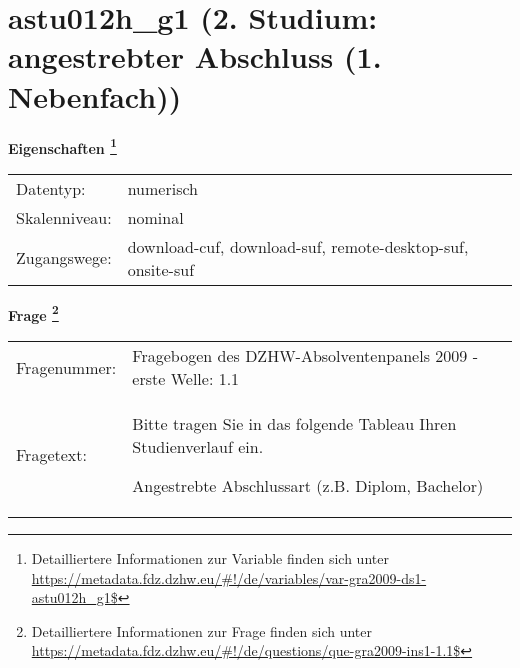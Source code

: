 
    \setcounter{footnote}{0}

    \vspace*{-1.8cm}
	\section{astu012h\_g1 (2. Studium: angestrebter Abschluss (1. Nebenfach))}
	\label{section:astu012h_g1}



    \vspace*{0.5cm}
    \noindent\textbf{Eigenschaften
	\footnote{Detailliertere Informationen zur Variable finden sich unter
		\url{https://metadata.fdz.dzhw.eu/\#!/de/variables/var-gra2009-ds1-astu012h_g1$}}}\\
	\begin{tabularx}{\hsize}{@{}lX}
	Datentyp: & numerisch \\
	Skalenniveau: & nominal \\
	Zugangswege: &
	  download-cuf, 
	  download-suf, 
	  remote-desktop-suf, 
	  onsite-suf
 \\
    \end{tabularx}



				\vspace*{0.5cm}
                \noindent\textbf{Frage
	                \footnote{Detailliertere Informationen zur Frage finden sich unter
		              \url{https://metadata.fdz.dzhw.eu/\#!/de/questions/que-gra2009-ins1-1.1$}}}\\
				\begin{tabularx}{\hsize}{@{}lX}
					Fragenummer: &
					  Fragebogen des DZHW-Absolventenpanels 2009 - erste Welle:
					  1.1
 \\
					Fragetext: & Bitte tragen Sie in das folgende Tableau Ihren Studienverlauf ein.\par  Angestrebte Abschlussart (z.B. Diplom, Bachelor) \\
				\end{tabularx}





